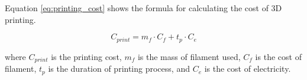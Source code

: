 Equation \ref{eq:printing_cost} shows the formula for calculating the cost of 3D printing.

\begin{equation}
    \label{eq:printing_cost}
    C_{print} = m_{f}\cdot C_{f}+t_{p}\cdot C_{e}
\end{equation}

where $C_{print}$ is the printing cost, $m_{f}$ is the mass of filament used, $C_{f}$ is the cost of filament, $t_{p}$ is the duration of printing process, and $C_{e}$ is the cost of electricity.


